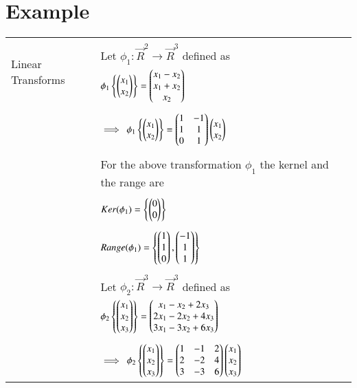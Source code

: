 \documentclass[journal,12pt]{IEEEtran}
\begin{document}
	\section{\textbf{Example}}
	\begin{longtable}{|l|l|}
		\hline
		\multirow{3}{*}{Linear Transforms }   
		& \\ 
		& Let $\phi_1 : \vec{R}^{2} \rightarrow \vec{R}^{3}$ defined as \\ Example
		& \qquad \qquad \qquad $\phi_1 \left\{ \begin{pmatrix}x_1 \\ x_2\end{pmatrix}\right\} = \begin{pmatrix}x_1 - x_2 \\ x_1 + x_2 \\ x_2\end{pmatrix}$ \qquad \qquad \\
		& \\
		& \qquad \qquad $\implies$ $\phi_1 \left\{ \begin{pmatrix}x_1 \\ x_2\end{pmatrix}\right\} = \begin{pmatrix}1&-1 \\ 1&1 \\ 0&1\end{pmatrix}\begin{pmatrix}x_1 \\ x_2\end{pmatrix}$\\
		& \\
		& For the above transformation $\phi_1$ the kernel and the range are \\
		& \\
		& \qquad \qquad $Ker(\phi_1) = \left\{ \begin{pmatrix}0 \\ 0\end{pmatrix}\right\}$ \\
		& \\
		& \qquad \qquad $Range(\phi_1) = \left\{ \begin{pmatrix}1 \\ 1 \\ 0\end{pmatrix}, \begin{pmatrix}-1 \\ 1 \\ 1\end{pmatrix}\right\}$ \\
		& \\
		& Let $\phi_2 : \vec{R}^{3} \rightarrow \vec{R}^{3}$ defined as \\ 
		& \qquad \qquad \qquad $\phi_2 \left\{ \begin{pmatrix}x_1 \\ x_2 \\ x_3\end{pmatrix}\right\} = \begin{pmatrix}x_1 - x_2 + 2x_3 \\ 2x_1 - 2x_2 + 4x_3 \\ 3x_1 - 3x_2 + 6x_3\end{pmatrix}$ \qquad \qquad \\
		& \\
		& \qquad \qquad $\implies$ $\phi_2 \left\{ \begin{pmatrix}x_1 \\ x_2 \\ x_3\end{pmatrix}\right\} = \begin{pmatrix}1&-1&2 \\ 2&-2&4 \\ 3&-3&6\end{pmatrix}\begin{pmatrix}x_1 \\ x_2 \\ x_3\end{pmatrix}$\\

\end{longtable}
\end{document}
